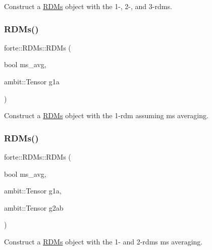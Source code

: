 Construct a \mbox{\hyperlink{classforte_1_1_r_d_ms}{R\+D\+Ms}} object with the 1-\/, 2-\/, and 3-\/rdms. 

\mbox{\label{classforte_1_1_r_d_ms_a5d0e8a491644764b0453f6e5dd5af1e3}} 
\subsubsection{\texorpdfstring{R\+D\+Ms()}{RDMs()}\hspace{0.1cm}{\footnotesize\ttfamily [5/7]}}
{\footnotesize\ttfamily forte\+::\+R\+D\+Ms\+::\+R\+D\+Ms (\begin{DoxyParamCaption}\item[{bool}]{ms\+\_\+avg,  }\item[{ambit\+::\+Tensor}]{g1a }\end{DoxyParamCaption})}



Construct a \mbox{\hyperlink{classforte_1_1_r_d_ms}{R\+D\+Ms}} object with the 1-\/rdm assuming ms averaging. 

\mbox{\label{classforte_1_1_r_d_ms_a6ea929edddecf163d671c277f74511a3}} 
\subsubsection{\texorpdfstring{R\+D\+Ms()}{RDMs()}\hspace{0.1cm}{\footnotesize\ttfamily [6/7]}}
{\footnotesize\ttfamily forte\+::\+R\+D\+Ms\+::\+R\+D\+Ms (\begin{DoxyParamCaption}\item[{bool}]{ms\+\_\+avg,  }\item[{ambit\+::\+Tensor}]{g1a,  }\item[{ambit\+::\+Tensor}]{g2ab }\end{DoxyParamCaption})}



Construct a \mbox{\hyperlink{classforte_1_1_r_d_ms}{R\+D\+Ms}} object with the 1-\/ and 2-\/rdms ms averaging. 

\mbox{\label{classforte_1_1_r_d_ms_a1b3619a5c52e318e87036348d2f409da}} 
